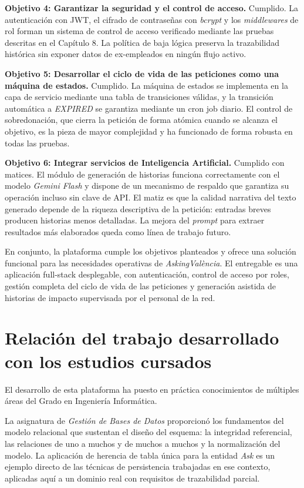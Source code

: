 \documentclass[11pt,oneside,spanish,listoffigures,listoftables]{tfgetsinf}
\begin{document}
\textbf{Objetivo 4: Garantizar la seguridad y el control de acceso.} Cumplido. La autenticación con JWT, el cifrado de contraseñas con \textit{bcrypt} y los \textit{middlewares} de rol forman un sistema de control de acceso verificado mediante las pruebas descritas en el Capítulo 8. La política de baja lógica preserva la trazabilidad histórica sin exponer datos de ex-empleados en ningún flujo activo.

\textbf{Objetivo 5: Desarrollar el ciclo de vida de las peticiones como una máquina de estados.} Cumplido. La máquina de estados se implementa en la capa de servicio mediante una tabla de transiciones válidas, y la transición automática a \textit{EXPIRED} se garantiza mediante un cron job diario. El control de sobredonación, que cierra la petición de forma atómica cuando se alcanza el objetivo, es la pieza de mayor complejidad y ha funcionado de forma robusta en todas las pruebas.

\textbf{Objetivo 6: Integrar servicios de Inteligencia Artificial.} Cumplido con matices. El módulo de generación de historias funciona correctamente con el modelo \textit{Gemini Flash} y dispone de un mecanismo de respaldo que garantiza su operación incluso sin clave de API. El matiz es que la calidad narrativa del texto generado depende de la riqueza descriptiva de la petición: entradas breves producen historias menos detalladas. La mejora del \textit{prompt} para extraer resultados más elaborados queda como línea de trabajo futuro.

En conjunto, la plataforma cumple los objetivos planteados y ofrece una solución funcional para las necesidades operativas de \textit{AskingValència}. El entregable es una aplicación full-stack desplegable, con autenticación, control de acceso por roles, gestión completa del ciclo de vida de las peticiones y generación asistida de historias de impacto supervisada por el personal de la red.

\section{Relación del trabajo desarrollado con los estudios cursados}

El desarrollo de esta plataforma ha puesto en práctica conocimientos de múltiples áreas del Grado en Ingeniería Informática.

La asignatura de \textit{Gestión de Bases de Datos} proporcionó los fundamentos del modelo relacional que sustentan el diseño del esquema: la integridad referencial, las relaciones de uno a muchos y de muchos a muchos y la normalización del modelo. La aplicación de herencia de tabla única para la entidad \textit{Ask} es un ejemplo directo de las técnicas de persistencia trabajadas en ese contexto, aplicadas aquí a un dominio real con requisitos de trazabilidad parcial.
\end{document}
